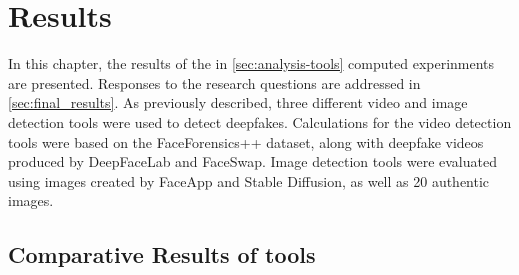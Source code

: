 
\chapter{Results}\label{chapter:results}
In this chapter, the results of the in \autoref{sec:analysis-tools} computed experinments are
presented. Responses to the research questions are addressed in \autoref{sec:final_results}.
As previously described, three different video and image detection tools were used
to detect deepfakes. Calculations for the video detection tools were based on the
FaceForensics++ dataset, along with deepfake videos produced by DeepFaceLab and FaceSwap.
Image detection tools were evaluated using images created by FaceApp and Stable Diffusion,
as well as 20 authentic images.

\section{Comparative Results of tools}

